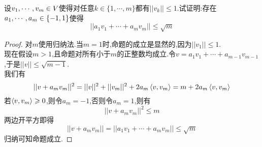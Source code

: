\documentclass{ctexart}
\begin{document}
\begin{problem}[23.]
    设${v}_1,\cdots,{v}_{m}\in V$使得对任意$k\in\{1,\cdots,m\}$都有$||v_k||\leqslant1$.试证明:存在${a}_1,\cdots,{a}_{m}\in\{-1,1\}$使得
    \[||a_1v_1+\cdots+a_mv_m||\leqslant\sqrt m\]
\end{problem}
\begin{proof}
    对$m$使用归纳法.当$m=1$时,命题的成立是显然的,因为$||v_1||\leqslant1$.\\
    现在假设$m>1$,且命题对所有小于$m$的正整数均成立.令$v=a_1v_1+\cdots+a_{m-1}v_{m-1}$,于是$||v||\leqslant\sqrt{m-1}$.\\
    我们有
    \[||v+a_mv_m||^2=||v||^2+||v_m||^2+2a_m\left\langle{v},{v_m}\right\rangle=m+2a_m\left\langle{v},{v_m}\right\rangle\]
    若$\left\langle{v},{v_m}\right\rangle\geqslant0$,则令$a_m=-1$,否则令$a_m=1$,则有
    \[||v+a_mv_m||^2\leqslant m\]
    两边开平方即得
    \[||v+a_mv_m||=||a_1v_1+\cdots+a_mv_m||\leqslant\sqrt{m}\]
    归纳可知命题成立.
\end{proof}
\begin{problem}
    
\end{problem}
\end{document}
